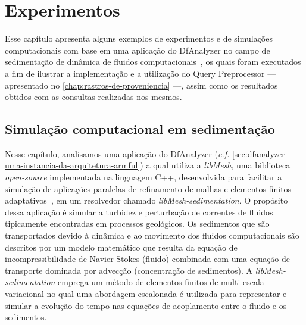 

\chapter{Experimentos}%
\label{chap:experimentos}

Esse capítulo apresenta alguns exemplos de experimentos e de simulações computacionais com base em uma aplicação do DfAnalyzer no campo de sedimentação de dinâmica de fluidos computacionais~\cite{silva2016situ}, os quais foram executados a fim de ilustrar a implementação e a utilização do Query Preprocessor --- apresentado no \autoref{chap:rastros-de-proveniencia} ---, assim como os resultados obtidos com as consultas realizadas nos mesmos.

\section{Simulação computacional em sedimentação}

Nesse capítulo, analisamos uma aplicação do DfAnalyzer (\textit{c.f.} \autoref{sec:dfanalyzer-uma-instancia-da-arquitetura-armful}) a qual utiliza a \textit{libMesh}, uma biblioteca \textit{open-source} implementada na linguagem C++, desenvolvida para facilitar a simulação de aplicações paralelas de refinamento de malhas e elementos finitos adaptativos~\cite{boncz2008breaking}, em um resolvedor chamado \textit{libMesh-sedimentation}. O propósito dessa aplicação é simular a turbidez e perturbação de correntes de fluidos tipicamente encontradas em processos geológicos. Os sedimentos que são transportados devido à dinâmica e ao movimento dos fluidos computacionais são descritos por um modelo matemático que resulta da equação de incompressibilidade de Navier-Stokes (fluido) combinada com uma equação de transporte dominada por advecção (concentração de sedimentos). A \textit{libMesh-sedimentation} emprega um método de elementos finitos de multi-escala variacional no qual uma abordagem escalonada é utilizada para representar e simular a evolução do tempo nas equações de acoplamento entre o fluido e os sedimentos. 

